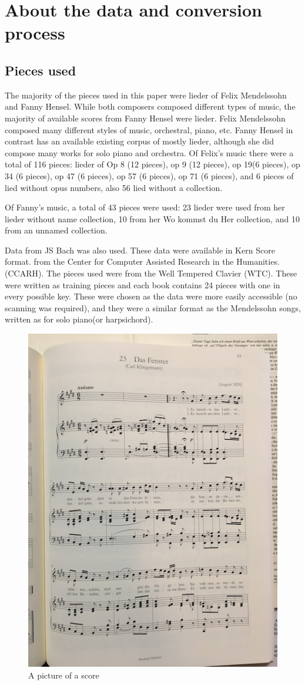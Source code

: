 \documentclass[12pt,twoside]{reedthesis}
\theoremstyle{definition}
\theoremstyle{definition}
\theoremstyle{definition}
\theoremstyle{remark}
\begin{document}
\chapter{About the data and conversion
process}\label{about-the-data-and-conversion-process}

\section{Pieces used}\label{pieces-used}

The majority of the pieces used in this paper were lieder of Felix
Mendelssohn and Fanny Hensel. While both composers composed different
types of music, the majority of available scores from Fanny Hensel were
lieder. Felix Mendelssohn composed many different styles of music,
orchestral, piano, etc. Fanny Hensel in contrast has an available
existing corpus of mostly lieder, although she did compose many works
for solo piano and orchestra. Of Felix's music there were a total of 116
pieces: lieder of Op 8 (12 pieces), op 9 (12 pieces), op 19(6 pieces),
op 34 (6 pieces), op 47 (6 pieces), op 57 (6 pieces), op 71 (6 pieces),
and 6 pieces of lied without opus numbers, also 56 lied without a
collection.

Of Fanny's music, a total of 43 pieces were used: 23 lieder were used
from her lieder without name collection, 10 from her Wo kommst du Her
collection, and 10 from an unnamed collection.

Data from JS Bach was also used. These data were available in Kern Score
format. from the Center for Computer Assisted Research in the
Humanities. (CCARH). The pieces used were from the Well Tempered Clavier
(WTC). These were written as training pieces and each book contains 24
pieces with one in every possible key. These were chosen as the data
were more easily accessible (no scanning was required), and they were a
similar format as the Mendelssohn songs, written as for solo piano(or
harpsichord).
\begin{figure}
\includegraphics[width=0.5\linewidth]{images/scorephoto} \caption{A picture of a score}\label{fig:unnamed-chunk-1}
\end{figure}
\end{document}
